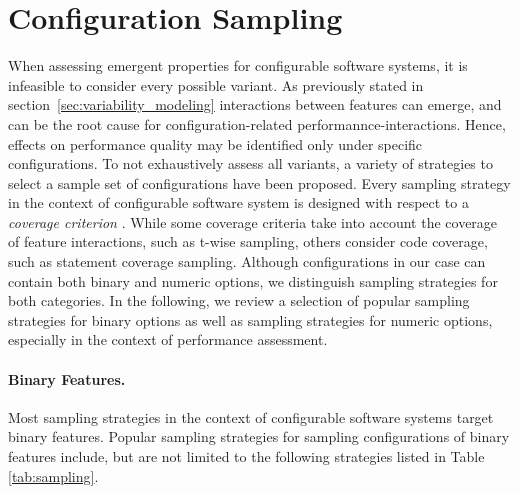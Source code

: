 \section{Configuration Sampling}\label{sec:configuration_sam}
When assessing emergent properties for configurable software systems, it is
infeasible to consider every possible variant. As previously stated in
section~\ref{sec:variability_modeling} interactions between
features can emerge, and can be the root cause for configuration-related
performannce-interactions. Hence, effects on performance quality may be
identified only under specific configurations. To not exhaustively assess all
variants, a variety of strategies to select a sample set of configurations have been proposed.
Every sampling strategy in the context of configurable software system is
designed with respect to a \emph{coverage criterion} 
\citep{apel_feature-oriented_2013}. While some coverage criteria take into
account the coverage of feature interactions, such as t-wise sampling, others
consider code coverage, such as statement coverage sampling. Although
configurations in our case can contain both binary and numeric options, we
distinguish sampling strategies for both categories. In the following, we
review a selection of popular sampling strategies for binary options as well as
sampling strategies for numeric options, especially in the context of
performance assessment.

\paragraph{Binary Features.}
Most sampling strategies in the context of configurable software systems
target binary features. Popular sampling strategies for sampling configurations
of binary features include, but are not limited to the following
\citep{apel_feature-oriented_2013,medeiros_comparison_2016} strategies listed in
Table \ref{tab:sampling}.

